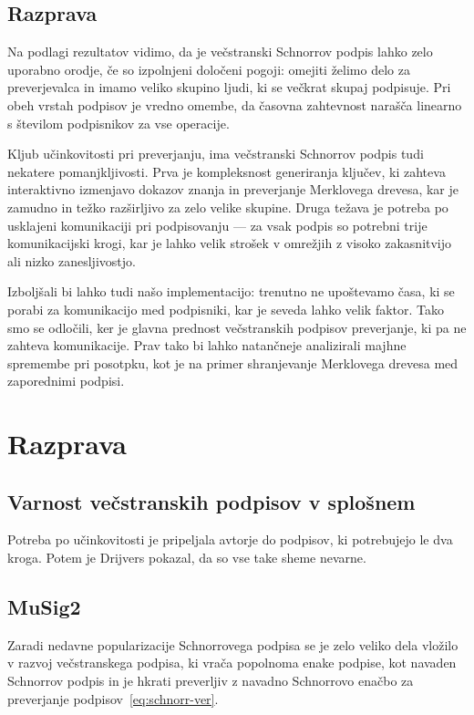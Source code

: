 \documentclass[isrm2, tisk]{fmfdelo}
\begin{document}
\subsection{Razprava}
Na podlagi rezultatov vidimo, da je večstranski Schnorrov podpis lahko zelo uporabno orodje, če so
izpolnjeni določeni pogoji: omejiti želimo delo za preverjevalca in imamo veliko skupino ljudi, ki
se večkrat skupaj podpisuje. Pri obeh vrstah podpisov je vredno omembe, da časovna zahtevnost narašča
linearno s številom podpisnikov za vse operacije.

Kljub učinkovitosti pri preverjanju, ima večstranski Schnorrov podpis tudi nekatere pomanjkljivosti.
Prva je kompleksnost generiranja ključev, ki zahteva interaktivno izmenjavo dokazov znanja in
preverjanje Merklovega drevesa, kar je zamudno in težko razširljivo za zelo velike skupine.
Druga težava je potreba po usklajeni komunikaciji pri podpisovanju — za vsak podpis so potrebni trije
komunikacijski krogi, kar je lahko velik strošek v omrežjih z visoko zakasnitvijo ali nizko zanesljivostjo.

Izboljšali bi lahko tudi našo implementacijo: trenutno ne upoštevamo časa, ki se porabi za
komunikacijo med podpisniki, kar je seveda lahko velik faktor. Tako smo se odločili, ker je glavna
prednost večstranskih podpisov preverjanje, ki pa ne zahteva komunikacije. Prav tako bi lahko
natančneje analizirali majhne spremembe pri posotpku, kot je na primer shranjevanje Merklovega drevesa
med zaporednimi podpisi.


\section{Razprava}
\label{sec:razprava}

\subsection{Varnost večstranskih podpisov v splošnem}
\label{sec:varnost}
Potreba po učinkovitosti je pripeljala avtorje do podpisov, ki potrebujejo le dva kroga. Potem je 
Drijvers pokazal, da so vse take sheme nevarne.

\subsection{MuSig2}
\label{sec:musig2}
Zaradi nedavne popularizacije Schnorrovega podpisa se je zelo veliko dela vložilo v razvoj večstranskega
podpisa, ki vrača popolnoma enake podpise, kot navaden Schnorrov podpis in je hkrati preverljiv
z navadno Schnorrovo enačbo za preverjanje podpisov~\eqref{eq:schnorr-ver}. 
\end{document}
